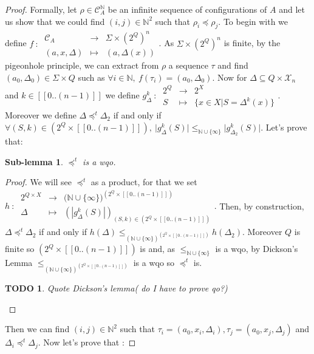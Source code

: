 \documentclass[a4paper,10pt]{report}
\newtheorem{slm}{Sub-lemma}[lm]
\newtheorem{td}{TODO}
\newcommand{\dmap}[5]{
#1~:~\begin{array}{ccccc}
#2 &\to& #3 \\
#4  &\mapsto& #5
\end{array}}
\newcommand{\seg}[1]{[\![#1]\!]}
\newcommand{\ts}{\seg{0 .. (n-1)}}
\newcommand{\C}{\mathcal{C}_{A}}
\newcommand{\X}{\mathcal{X}_{n}}
\begin{document}
\begin {proof}
Formally, let $\rho \in \C^{\mathbb N}$ be an infinite sequence of configurations of $A$ and let us show that we could find $(i,j) \in \mathbb{N}^2$ such that $\rho_i \preceq \rho_j$.
To begin with we define
$\dmap{f}{\C}{\Sigma \times {(2^Q)}^n}{(a,x,\Delta)}{(a,\Delta(x))}$.
As $\Sigma \times {(2^Q)}^n$ is finite, by the pigeonhole principle, we can extract from $\rho$ a sequence $\tau$ and find $(a_0,\Delta_0) \in \Sigma \times Q$ such as 
$\forall i \in \mathbb N,\ f(\tau_i)=(a_0,\Delta_0)$.
Now for $\Delta \subseteq Q \times \X $ and $k \in \ts$ we define $\dmap{g^k_\Delta}{2^Q}{2^X}{S}{\{ x \in X | S=\Delta^k(x) \}} .$
Moreover we define $\Delta \preceq^t \Delta_2$ if and only if $\forall (S,k) \in (2^Q \times \ts) ,\ \lvert g^k_\Delta(S) \lvert \leq_{\mathbb N \cup \{\infty\}} \lvert g^k_{\Delta_2}(S) \lvert$. Let's prove that: 
\begin{slm}
  $\preceq^t$ is a wqo.
\end{slm}
\begin{proof}
We will see $\preceq^t$ as a product, for that we set $ \dmap{h}{2^{Q\times X}}{({\mathbb N \cup \{\infty\})}^{(2^Q \times \ts)}}{\Delta}{(|g^k_{\Delta}(S)|)_{(S,k)\in (2^Q \times \ts)  }}.$
Then, by construction, $\Delta \preceq^t \Delta_2$ if and only if $ h(\Delta) \leq_{{(\mathbb N \cup \{\infty\})}^{(2^Q \times \ts)}} h(\Delta_2)$.
Moreover $Q$ is finite so $(2^Q \times \ts)$ is and, as $\leq_{\mathbb N \cup \{\infty\}}$ is a wqo, by Dickson's Lemma $\leq_{{(\mathbb N \cup \{\infty\})}^{(2^Q \times \ts)}}$
is a wqo so $\preceq^t$ is.
\begin{td}
  Quote Dickson's lemma( do I have to prove qo?) 
\end{td}
\end{proof}
Then we can find $(i,j)\in \mathbb{N}^2$ such that $\tau_i=(a_0,x_i,\Delta_i), \tau_j=(a_0,x_j,\Delta_j)$ and $\Delta_i \preceq^t \Delta_j$.
Now let's prove that :


\end{proof}
\end{document}
